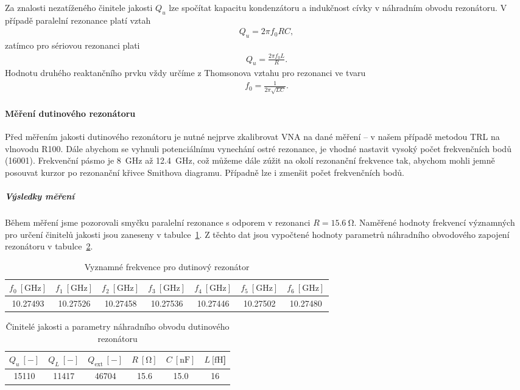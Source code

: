 \documentclass[11pt,a4paper]{article}
\newcommand{\Ohm}{\mathrm{\Omega}}
\newcommand{\GHz}{\mathrm{GHz}}
\begin{document}
Za znalosti nezatíženého činitele jakosti $Q_u$ lze spočítat kapacitu kondenzátoru a indukčnost cívky v náhradním obvodu rezonátoru. V případě paralelní rezonance platí vztah
\begin{align}
    Q_u = 2\pi f_0RC,
\end{align}
zatímco pro sériovou rezonanci plati
\begin{align}
    Q_u = \frac{2\pi f_0 L}{R}.
\end{align}
Hodnotu druhého reaktančního prvku vždy určíme z Thomsonova vztahu pro rezonanci ve tvaru
\begin{align}
    f_0 = \frac{1}{2\pi\sqrt{LC}}.
\end{align}

\paragraph*{Měření dutinového rezonátoru} Před měřením jakosti dutinového rezonátoru je nutné nejprve zkalibrovat VNA na dané měření -- v našem případě metodou TRL na vlnovodu R100. Dále abychom se vyhnuli potenciálnímu vynechání ostré rezonance, je vhodné nastavit vysoký počet frekvenčních bodů (16001). Frekvenční pásmo je 8~GHz až 12.4~GHz, což můžeme dále zúžit na okolí rezonanční frekvence tak, abychom mohli jemně posouvat kurzor po rezonanční křivce Smithova diagramu. Případně lze i zmenšit počet frekvenčních bodů.

\subparagraph*{Výsledky měření} Během měření jsme pozorovali smyčku paralelní rezonance s odporem v rezonanci $R = 15.6\ \Ohm$. Naměřené hodnoty frekvencí významných pro určení činitelů jakosti jsou zaneseny v tabulce~\ref{table:dutinovy-rezonator-frekvence}. Z těchto dat jsou vypočtené hodnoty parametrů náhradního obvodového zapojení rezonátoru v tabulce~\ref{table:dutinovy-rezonator-hodnoty}.
\begin{table}[!ht]
\centering
\begin{tabular}{|c|c|c|c|c|c|c|}
    \hline
    $f_0\ [\GHz]$ & $f_1\ [\GHz]$ & $f_2\ [\GHz]$ & $f_3\ [\GHz]$ & $f_4\ [\GHz]$ & $f_5\ [\GHz]$ & $f_6\ [\GHz]$\\
    \hline\hline
    10.27493 & 10.27526 & 10.27458 & 10.27536 & 10.27446 & 10.27502 & 10.27480\\
    \hline
\end{tabular}
\caption{\label{table:dutinovy-rezonator-frekvence}Vyznamné frekvence pro dutinový rezonátor}
\end{table}
\begin{table}[!ht]
\centering
\begin{tabular}{|c|c|c|c|c|c|}
    \hline
    $Q_u\ [-]$ & $Q_L\ [-]$ & $Q_{\mathrm{ext}}\ [-]$ & $R\ [\mathrm{\Omega}]$ & $C\ [\mathrm{nF}]$ & $L\ [\mathrm{fH}$]\\
    \hline\hline
    15110 & 11417 & 46704 & 15.6 & 15.0 & 16\\
    \hline
\end{tabular}
\caption{\label{table:dutinovy-rezonator-hodnoty}Činitelé jakosti a parametry náhradního obvodu dutinového rezonátoru}
\end{table}
\end{document}
